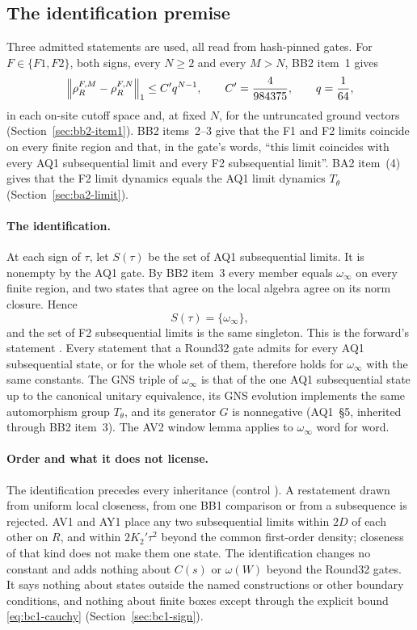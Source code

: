 \subsection{The identification premise}
\label{sec:bc1-identification}
Three admitted statements are used, all read from hash-pinned gates. For
$F\in\{F1,F2\}$, both signs, every $N\ge2$ and every $M>N$, BB2 item~1 gives
\begin{equation}
 \left\lVert\rho^{F,M}_R-\rho^{F,N}_R\right\rVert_1\le C'q^{N-1},\qquad
 C'=\frac4{984375},\qquad q=\frac1{64},
 \label{eq:bc1-cauchy}
\end{equation}
in each on-site cutoff space and, at fixed $N$, for the untruncated ground
vectors (Section~\ref{sec:bb2-item1}). BB2 items~2--3 give that the F1 and
F2 limits coincide on every finite region and that, in the gate's words,
``this limit coincides with every AQ1 subsequential limit and every F2
subsequential limit''. BA2 item~(4) gives that the F2 limit dynamics equals
the AQ1 limit dynamics $T_\theta$ (Section~\ref{sec:ba2-limit}).

\paragraph{The identification.} At each sign of $\tau$, let $S(\tau)$ be the
set of AQ1 subsequential limits. It is nonempty by the AQ1 gate. By BB2
item~3 every member equals $\omega_\infty$ on every finite region, and two
states that agree on the local algebra agree on its norm closure. Hence
\begin{equation}
 S(\tau)=\{\omega_\infty\},
 \label{eq:bc1-identification}
\end{equation}
and the set of F2 subsequential limits is the same singleton. This is the
forward's statement . Every statement that a Round32
gate admits for every AQ1 subsequential state, or for the whole set of them,
therefore holds for $\omega_\infty$ with the same constants. The GNS triple of
$\omega_\infty$ is that of the one AQ1 subsequential state up to the canonical
unitary equivalence, its GNS evolution implements the same automorphism
group $T_\theta$, and its generator $G$ is nonnegative (AQ1~\S5, inherited
through BB2 item~3). The AV2 window lemma applies to $\omega_\infty$ word for
word.

\paragraph{Order and what it does not license.} The identification precedes
every inheritance (control ). A
restatement drawn from uniform local closeness, from one BB1 comparison or
from a subsequence is rejected. AV1 and AY1 place any two subsequential
limits within $2D$ of each other on $R$, and within $2K_2'\tau^2$ beyond the
common first-order density; closeness of that kind does not make them one
state. The identification changes no
constant and adds nothing about $C(s)$ or $\omega(W)$ beyond the Round32
gates. It says nothing about states outside the named constructions or other
boundary conditions, and nothing about finite boxes except through the
explicit bound \eqref{eq:bc1-cauchy} (Section~\ref{sec:bc1-sign}).

